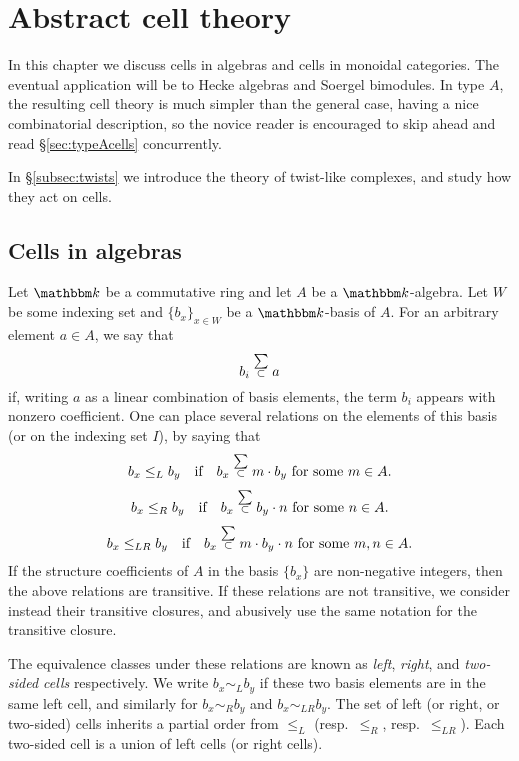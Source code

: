 \section{Abstract cell theory}
\label{sec:cells}

In this chapter we discuss cells in algebras and cells in monoidal categories. The eventual application will be to Hecke algebras and Soergel bimodules. In type $A$, the resulting cell theory is much simpler than the general case, having a nice combinatorial description, so the novice reader is encouraged to skip ahead and read \S\ref{sec:typeAcells} concurrently.

In \S\ref{subsec:twists} we introduce the theory of twist-like complexes, and study how they act on cells.



\subsection{Cells in algebras}
\label{subsec:algCells}

Let $\kbbm$ be a commutative ring and let $A$ be a $\kbbm$-algebra.  Let $W$ be some indexing set and $\{b_x\}_{x \in W}$ be a $\kbbm$-basis of $A$. For an arbitrary element $a \in A$, we say that $$b_i \stackrel{\scriptscriptstyle \sum}{\scriptstyle{\subset}} a$$ if, writing $a$ as a linear combination of basis elements, the term $b_i$ appears with nonzero coefficient.   One can place several relations on the elements of this basis (or on the indexing set $I$), by saying that
\[ b_x \le_{L} b_y \quad \textrm{if} \quad b_x \stackrel{\scriptscriptstyle \sum}{\scriptstyle{\subset}} m \cdot b_y \textrm{ for some } m \in A. \]
\[ b_x \le_{R} b_y \quad \textrm{if} \quad b_x \stackrel{\scriptscriptstyle \sum}{\scriptstyle{\subset}} b_y \cdot n \textrm{ for some } n \in A. \]
\[ b_x \le_{LR} b_y \quad \textrm{if} \quad b_x \stackrel{\scriptscriptstyle \sum}{\scriptstyle{\subset}} m \cdot b_y \cdot n \textrm{ for some  } m, n \in A. \]
If the structure coefficients of $A$ in the basis $\{b_x\}$ are non-negative integers, then the above relations are transitive.  If these relations are not transitive, we consider instead their transitive closures, and abusively use the same notation for the transitive closure.

The equivalence classes under these relations are known as \emph{left}, \emph{right}, and \emph{two-sided cells} respectively. We write $b_x \sim_L b_y$ if these two basis elements are in the same left cell, and similarly for $b_x \sim_R b_y$ and $b_x \sim_{LR} b_y$.  The set of left (or right, or two-sided) cells inherits a partial order from $\leq_L$ (resp.~$\leq_R$, resp.~$\leq_{LR}$).  Each two-sided cell is a union of left cells (or right cells).

